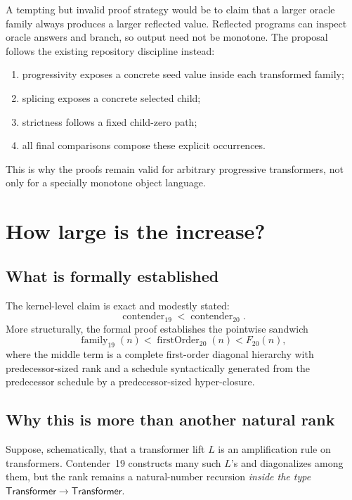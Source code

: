 \documentclass[11pt]{article}
\theoremstyle{definition}
\theoremstyle{remark}
\newcommand{\Tr}{\mathsf{Transformer}}
\begin{document}
A tempting but invalid proof strategy would be to claim that a larger oracle
family always produces a larger reflected value. Reflected programs can inspect
oracle answers and branch, so output need not be monotone. The proposal follows
the existing repository discipline instead:

\begin{enumerate}[leftmargin=*]
\item progressivity exposes a concrete seed value inside each transformed
  family;
\item splicing exposes a concrete selected child;
\item strictness follows a fixed child-zero path;
\item all final comparisons compose these explicit occurrences.
\end{enumerate}

This is why the proofs remain valid for arbitrary progressive transformers,
not only for a specially monotone object language.

\section{How large is the increase?}

\subsection{What is formally established}

The kernel-level claim is exact and modestly stated:
\[
  \operatorname{contender}_{19}<\operatorname{contender}_{20}.
\]
More structurally, the formal proof establishes the pointwise sandwich
\[
  \operatorname{family}_{19}(n)
  < \operatorname{firstOrder}_{20}(n)
  < F_{20}(n),
\]
where the middle term is a complete first-order diagonal hierarchy with
predecessor-sized rank and a schedule syntactically generated from the
predecessor schedule by a predecessor-sized hyper-closure.

\subsection{Why this is more than another natural rank}

Suppose, schematically, that a transformer lift $L$ is an amplification rule on
transformers. Contender~19 constructs many such $L$'s and diagonalizes among
them, but the rank remains a natural-number recursion \emph{inside the type}
$\Tr\to\Tr$.
\end{document}
